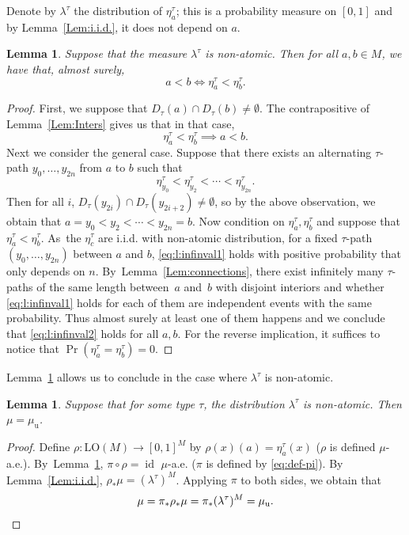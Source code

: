 \documentclass[11pt]{article}
\theoremstyle{plain}
\newtheorem{lemma}[theorem]{Lemma}
\theoremstyle{definition}
\DeclareMathOperator{\id}{id}
\newcommand{\LO}{\mathrm{LO}}
\newcommand{\muu}{\mu_{\mathrm{u}}}
\begin{document}
Denote by $\lambda^\tau$ the distribution of $\eta^\tau_a$; this is a probability measure on $[0, 1]$ and by Lemma~\ref{Lem:i.i.d.}, it does not depend on $a$.
\begin{lemma}
\label{Lem:atomless}
Suppose that the measure $\lambda^\tau$ is non-atomic. Then for all $a, b \in M$, we have that, almost surely,
\begin{equation*}
a < b \iff \eta^\tau_a < \eta^\tau_b.
\end{equation*}
\end{lemma}
\begin{proof}
First, we suppose that $D_\tau (a) \cap D_\tau (b) \neq \emptyset$. The contrapositive of Lemma~\ref{Lem:Inters} gives us that in that case,
\begin{equation}
\label{eq:l:infinval2}
\eta_a^\tau < \eta_b^\tau \implies a < b.
\end{equation}
Next we consider the general case. Suppose that there exists an alternating $\tau$-path $y_0, \ldots, y_{2n}$ from $a$ to $b$ such that
\begin{equation}
\label{eq:l:infinval1}
\eta^\tau_{y_0} < \eta^\tau_{y_2} < \cdots < \eta^\tau_{y_{2n}}.
\end{equation}
Then for all $i$, $D_\tau(y_{2i}) \cap D_\tau(y_{2i+2}) \neq \emptyset$, so by the above observation, we obtain that $a = y_0 < y_2 < \cdots < y_{2n} = b$. Now condition on $\eta^\tau_a, \eta^\tau_b$ and suppose that $\eta^\tau_a < \eta^\tau_b$. As~the $\eta^\tau_c$ are i.i.d. with non-atomic distribution, for a fixed $\tau$-path $(y_0, \ldots, y_{2n})$ between $a$ and $b$, \eqref{eq:l:infinval1} holds with positive probability that only depends on $n$. By~Lemma~\ref{Lem:connections}, there exist infinitely many $\tau$-paths of the same length between~$a$ and~$b$ with disjoint interiors and whether \eqref{eq:l:infinval1} holds for each of them are independent events with the same probability. Thus almost surely at least one of them happens and we conclude that \eqref{eq:l:infinval2} holds for all $a, b$. For the reverse implication, it suffices to notice that $\Pr(\eta^\tau_a = \eta^\tau_b) = 0$.
\end{proof}

Lemma~\ref{Lem:atomless} allows us to conclude in the case where $\lambda^\tau$ is non-atomic.
\begin{lemma}
\label{l:non-atomic}
Suppose that for some type $\tau$, the distribution $\lambda^\tau$ is non-atomic. Then $\mu = \muu$.
\end{lemma}
\begin{proof}
Define $\rho \colon \LO(M) \to [0, 1]^M$ by $\rho(x)(a) = \eta^\tau_a(x)$ ($\rho$ is defined $\mu$-a.e.). By~Lemma~\ref{Lem:atomless}, $\pi \circ \rho = \id$ $\mu$-a.e. ($\pi$ is defined by \eqref{eq:def-pi}). By Lemma~\ref{Lem:i.i.d.}, $\rho_* \mu = (\lambda^\tau)^M$. Applying $\pi$ to both sides, we obtain that
\begin{equation*}
\mu = \pi_* \rho_* \mu = \pi_*(\lambda^\tau)^M = \muu. \qedhere
\end{equation*}
\end{proof}
\end{document}
